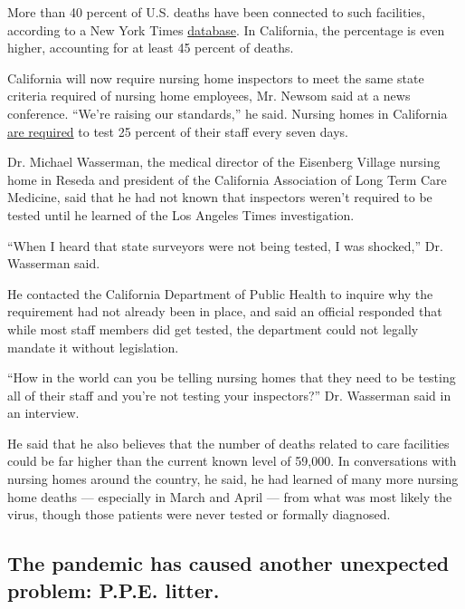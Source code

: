 More than 40 percent of U.S. deaths have been connected to such
facilities, according to a New York Times
\href{https://www.nytimes3xbfgragh.onion/interactive/2020/us/coronavirus-nursing-homes.html}{database}.
In California, the percentage is even higher, accounting for at least 45
percent of deaths.

California will now require nursing home inspectors to meet the same
state criteria required of nursing home employees, Mr. Newsom said at a
news conference. ``We're raising our standards,'' he said. Nursing homes
in California
\href{https://www.cdph.ca.gov/Programs/CHCQ/LCP/Pages/AFL-20-53.aspx}{are
required} to test 25 percent of their staff every seven days.

Dr. Michael Wasserman, the medical director of the Eisenberg Village
nursing home in Reseda and president of the California Association of
Long Term Care Medicine, said that he had not known that inspectors
weren't required to be tested until he learned of the Los Angeles Times
investigation.

``When I heard that state surveyors were not being tested, I was
shocked,'' Dr. Wasserman said.

He contacted the California Department of Public Health to inquire why
the requirement had not already been in place, and said an official
responded that while most staff members did get tested, the department
could not legally mandate it without legislation.

``How in the world can you be telling nursing homes that they need to be
testing all of their staff and you're not testing your inspectors?'' Dr.
Wasserman said in an interview.

He said that he also believes that the number of deaths related to care
facilities could be far higher than the current known level of 59,000.
In conversations with nursing homes around the country, he said, he had
learned of many more nursing home deaths --- especially in March and
April --- from what was most likely the virus, though those patients
were never tested or formally diagnosed.

\hypertarget{the-pandemic-has-caused-another-unexpected-problem-ppe-litter}{%
\subsection{The pandemic has caused another unexpected problem: P.P.E.
litter.}\label{the-pandemic-has-caused-another-unexpected-problem-ppe-litter}}

